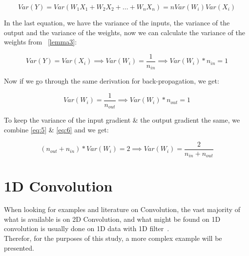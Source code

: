 \documentclass[a4paper, 12pt]{report}
\begin{document}
\begin{center}
	\begin{equation}
	 Var(Y) = Var(W_1X_1 + W_2X_2 + ... + W_n X_n) = nVar(W_i)Var(X_i) \label{eq:4}
	\end{equation}
\end{center}
In the last equation, we have the variance of the inputs, the variance of the output and the variance of the weights, now we can calculate the variance of the weights from ~\cref{lemma3}:
\begin{center}
	\begin{equation}
	 Var(Y) = Var(X_i) \implies Var(W_i) = \frac{1}{n_{in}} \implies Var(W_i) * n_{in} = 1  \label{eq:5}
	\end{equation}
\end{center}
Now if we go through the same derivation for back-propagation, we get:
\begin{center}
	\begin{equation}
	Var(W_i) = \frac{1}{n_{out}} \implies Var(W_i) * n_{out} = 1 \label{eq:6}
	\end{equation}
\end{center}
To keep the variance of the input gradient \& the output gradient the same, we combine
\eqref{eq:5} \& \eqref{eq:6} and we get:
\begin{center}
	\begin{equation}
	(n_{out} + n_{in}) * Var(W_i) = 2 \implies Var(W_i) = \frac{2}{n_{in} + n_{out}} \label{eq:7}
	\end{equation}
\end{center}
\newpage
\section{\textbf{1D Convolution}}\label{Conv1D}
When looking for examples and literature on Convolution, the vast majority of what is available is on 2D Convolution, and what might be found on 1D convolution is usually done on 1D data with 1D filter~\citep{math-behind-1d-convolution-with-advanced-examples-in-tf}.\\
Therefor, for the purposes of this study, a more complex example will be presented.
\end{document}
